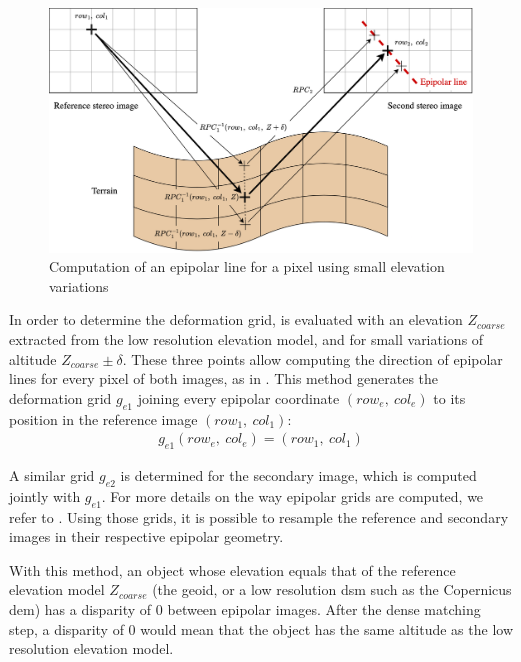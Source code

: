 \begin{figure}
    \centering
    \includegraphics[width=\linewidth]{Images/Chap_1/epipolar_lines.png}
    \caption{Computation of an epipolar line for a pixel using small elevation variations}
    \label{fig:epipolar_lines}
\end{figure}

In order to determine the deformation grid,  is evaluated with an elevation $Z_{coarse}$ extracted from the low resolution elevation model, and for small variations of altitude $Z_{coarse}\pm\delta$. These three points allow computing the direction of epipolar lines for every pixel of both images, as in . This method generates the deformation grid $g_{e1}$ joining every epipolar coordinate $(row_e, ~col_e)$ to its position in the reference image $(row_1, ~col_1)$:
\begin{align}\label{eq:epipolar_grid}
    g_{e1}(row_e, ~col_e) = (row_1, ~col_1)
\end{align}

A similar grid $g_{e2}$ is determined for the secondary image, which is computed jointly with $g_{e1}$. For more details on the way epipolar grids are computed, we refer to \cite{michel_new_2020}. Using those grids, it is possible to resample the reference and secondary images in their respective epipolar geometry. 

\begin{remark}
    With this method, an object whose elevation equals that of the reference elevation model $Z_{coarse}$ (\ie the geoid, or a low resolution \acrshort{dsm} such as the Copernicus \acrshort{dem}) has a disparity of $0$ between epipolar images. After the dense matching step, a disparity of $0$ would mean that the object has the same altitude as the low resolution elevation model.
\end{remark}

